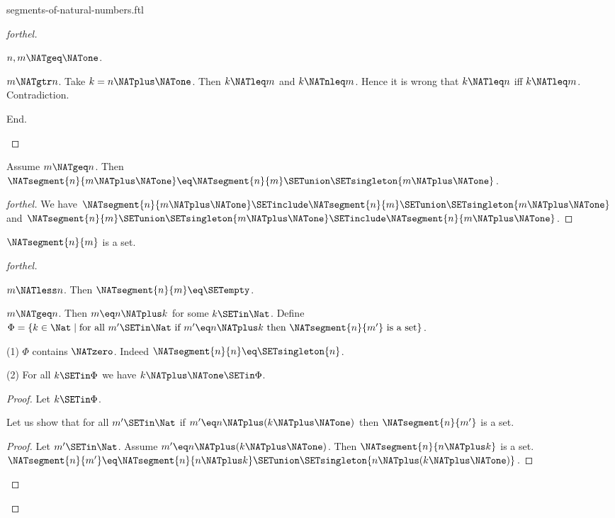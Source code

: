 \documentclass{naproche-library}
\begin{document}
\begin{smodule}[title=Segments of the Natural Numbers]{segments-of-natural-numbers.ftl}
\begin{proof}[forthel]
\begin{case}{$n, m \NATgeq \NATone$.}
      \begin{case}{$m \NATgtr n$.}
        Take $k = n \NATplus \NATone$.
        Then $k \NATleq m$ and $k \NATnleq m$.
        Hence it is wrong that $k \NATleq n$ iff $k \NATleq m$.
        Contradiction.
      \end{case}
    End.
  \end{case}
\end{proof}

\begin{proposition}[forthel,id=NatSegSuccProp]
  Assume $m\NATgeq n$.
  Then $\NATsegment{n}{m \NATplus \NATone} \eq \NATsegment{n}{m} \SETunion \SETsingleton{m \NATplus \NATone}$.
\end{proposition}
\begin{proof}[forthel]
  We have $\NATsegment{n}{m \NATplus \NATone} \SETinclude \NATsegment{n}{m} \SETunion \SETsingleton{m \NATplus \NATone}$
  and $\NATsegment{n}{m} \SETunion \SETsingleton{m \NATplus \NATone} \SETinclude \NATsegment{n}{m \NATplus \NATone}$.
\end{proof}

\begin{proposition}[forthel,id=NatSegFinProp]
  $\NATsegment{n}{m}$ is a set.
\end{proposition}
\begin{proof}[forthel]
  \begin{case}{$m\NATless n$.}
    Then $\NATsegment{n}{m}\eq\SETempty$.
  \end{case}

  \begin{case}{$m\NATgeq n$.}
    Then $m\eq n\NATplus k$ for some $k\SETin\Nat$.
    Define $\Phi=\{k\in\Nat\mid\text{for all }m'\SETin\Nat\text{ if }m'\eq n\NATplus k\text{ then }\NATsegment{n}{m'}\text{ is a set}\}$.
    
    (1) $\Phi$ contains $\NATzero$.
    Indeed $\NATsegment{n}{n}\eq\SETsingleton{n}$.

    (2) For all $k\SETin\Phi$ we have $k\NATplus\NATone\SETin\Phi$.
    \begin{proof}
      Let $k\SETin\Phi$.

      Let us show that for all $m'\SETin\Nat$ if $m'\eq n\NATplus(k\NATplus\NATone)$ then $\NATsegment{n}{m'}$ is a set.
      \begin{proof}
        Let $m'\SETin\Nat$.
        Assume $m'\eq n\NATplus(k\NATplus\NATone)$.
        Then $\NATsegment{n}{n\NATplus k}$ is a set.
        $\NATsegment{n}{m'}\eq\NATsegment{n}{n\NATplus k}\SETunion\SETsingleton{n\NATplus(k\NATplus\NATone)}$.
      \end{proof}
    \end{proof}


\end{case}
\end{proof}
\end{smodule}
\end{document}
